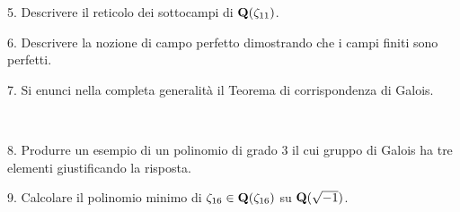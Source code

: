 \item{5.} Descrivere il reticolo dei sottocampi di ${\bf Q}(\zeta_{11})$.
\ve\ \vs

\item{6.} Descrivere la nozione di campo perfetto dimostrando che i campi finiti
sono perfetti.

\vv \item{7.} Si enunci nella completa generalit\`a il Teorema di
corrispondenza di Galois.

\ve\ \vs


\item{8.} Produrre un esempio di un polinomio di grado $3$ il cui gruppo di Galois ha tre elementi giustificando la risposta.

\vv

\item{9.} Calcolare il polinomio minimo di $\zeta_{16}\in{\bf Q}(\zeta_{16})$ su ${\bf Q}(\sqrt{-1})$.

\ \vst
 \bye
